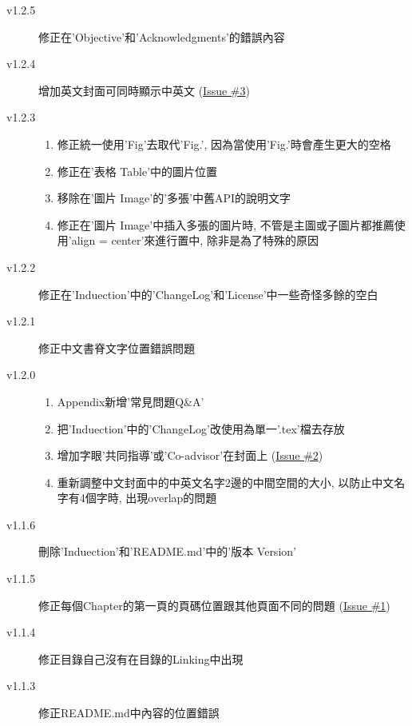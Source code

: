 \begin{description}
  \item[v1.2.5] 修正在'Objective'和'Acknowledgments'的錯誤內容

  \item[v1.2.4] 增加英文封面可同時顯示中英文 (\href{https://github.com/wengan-li/ncku-thesis-template-latex/issues/3}{Issue \#3})

  \item[v1.2.3] \hfill
    \begin{enumerate}
      \item 修正統一使用'Fig'去取代'Fig.', 因為當使用'Fig.'時會產生更大的空格
      \item 修正在'表格 Table'中的圖片位置
      \item 移除在'圖片 Image'的'多張'中舊API的說明文字
      \item 修正在'圖片 Image'中插入多張的圖片時, 不管是主圖或子圖片都推薦使用'align = center'來進行置中, 除非是為了特殊的原因
    \end{enumerate}

  \item[v1.2.2] 修正在'Induection'中的'ChangeLog'和'License'中一些奇怪多餘的空白

  \item[v1.2.1] 修正中文書脊文字位置錯誤問題

  \item[v1.2.0] \hfill
    \begin{enumerate}
      \item Appendix新增'常見問題Q\&A'
      \item 把'Induection'中的'ChangeLog'改使用為單一'.tex'檔去存放
      \item 增加字眼'共同指導'或'Co-advisor'在封面上 (\href{https://github.com/wengan-li/ncku-thesis-template-latex/issues/2}{Issue \#2})
      \item 重新調整中文封面中的中英文名字2邊的中間空間的大小, 以防止中文名字有4個字時, 出現overlap的問題
    \end{enumerate}

  \item[v1.1.6] 刪除'Induection'和'README.md'中的'版本 Version'

  \item[v1.1.5] 修正每個Chapter的第一頁的頁碼位置跟其他頁面不同的問題 (\href{https://github.com/wengan-li/ncku-thesis-template-latex/issues/1}{Issue \#1})

  \item[v1.1.4] 修正目錄自己沒有在目錄的Linking中出現

  \item[v1.1.3] 修正README.md中內容的位置錯誤


\end{description}
